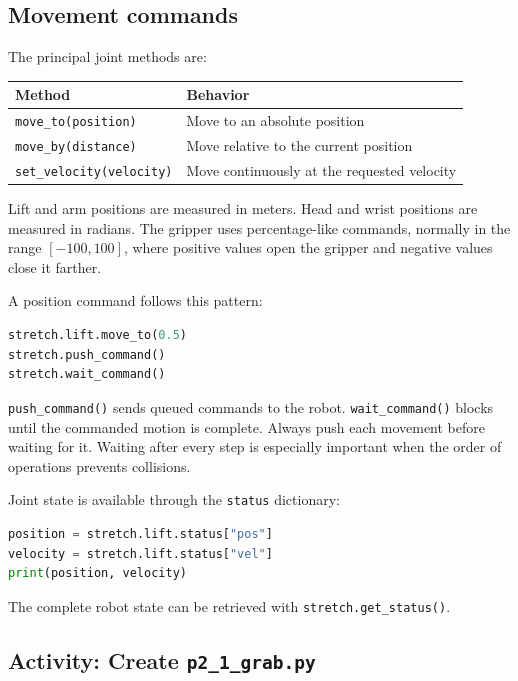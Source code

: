 \documentclass[11pt,a4paper]{article}
\begin{document}
\subsection*{Movement commands}

The principal joint methods are:

\begin{center}
\begin{tabular}{|l|l|}
\hline
\textbf{Method} & \textbf{Behavior} \\
\hline
\texttt{move\_to(position)} & Move to an absolute position \\
\texttt{move\_by(distance)} & Move relative to the current position \\
\texttt{set\_velocity(velocity)} & Move continuously at the requested velocity \\
\hline
\end{tabular}
\end{center}

Lift and arm positions are measured in meters. Head and wrist positions are
measured in radians. The gripper uses percentage-like commands, normally in the
range $[-100,100]$, where positive values open the gripper and negative values
close it farther.

A position command follows this pattern:

\begin{lstlisting}[language=Python]
stretch.lift.move_to(0.5)
stretch.push_command()
stretch.wait_command()
\end{lstlisting}

\texttt{push\_command()} sends queued commands to the robot.
\texttt{wait\_command()} blocks until the commanded motion is complete. Always
push each movement before waiting for it. Waiting after every step is especially
important when the order of operations prevents collisions.

Joint state is available through the \texttt{status} dictionary:

\begin{lstlisting}[language=Python]
position = stretch.lift.status["pos"]
velocity = stretch.lift.status["vel"]
print(position, velocity)
\end{lstlisting}

The complete robot state can be retrieved with \texttt{stretch.get\_status()}.

\subsection*{Activity: Create \texttt{p2\_1\_grab.py}}
\end{document}
